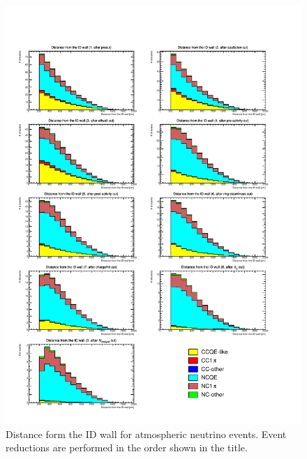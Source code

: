 \begin{figure}[h]
	\centering
	\includegraphics[width=15cm]{PDF/Dist_ATM/Che_50deg_tag_ge1/All/dwall}
	\caption[Distance from the ID wall for atmospheric neutrino events]{
	Distance form the ID wall for atmospheric neutrino events.
	Event reductions are performed in the order shown in the title.
	}\label{ATM_dwall}
\end{figure}

